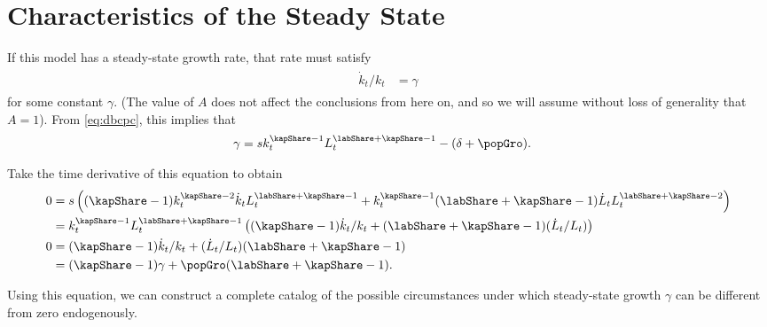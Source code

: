 \documentclass{handout}
\begin{document}
\section{Characteristics of the Steady State}

If this model has a steady-state growth rate, that rate must
satisfy
\begin{equation}\begin{gathered}\begin{aligned}
  \label{eq:ss}
  \dot{k}_t / k_t & =  \gamma
\end{aligned}\end{gathered}\end{equation}
for some constant $\gamma$.  (The value of $A$ does not affect the conclusions
from here on, and so we will assume without loss of generality that $A=1$).  From \eqref{eq:dbcpc}, this implies
that 
\begin{equation}\begin{gathered}\begin{aligned}
  \gamma & =  s k_t^{\kapShare-1} L^{\labShare+\kapShare-1}_t - (\delta+\popGro). \label{eq:gdyn}
\end{aligned}\end{gathered}\end{equation}

Take the time derivative of this equation to obtain
\begin{equation}\begin{gathered}\begin{aligned}
  0 & =  s\left((\kapShare-1)k_t^{\kapShare-2}\dot{k}_t L_t^{\labShare+\kapShare-1}+k_t^{\kapShare-1}(\labShare+\kapShare-1)\dot{L}_t L_t^{\labShare+\kapShare-2}\right)
\\  & =  k_{t}^{\kapShare-1}L_{t}^{\labShare+\kapShare-1}\left((\kapShare-1)\dot{k}_t/k_{t} +(\labShare+\kapShare-1)(\dot{L}_t/L_t)\right)
\\ 0 & =  (\kapShare-1) \dot{k}_t/k_t + (\dot{L}_t/L_t) (\labShare+\kapShare-1)
\\   & =  (\kapShare-1) \gamma + \popGro (\labShare+\kapShare-1). \label{eq:AKeqn}
\end{aligned}\end{gathered}\end{equation}

Using this equation, we can construct a complete catalog of the
possible circumstances under which steady-state growth $\gamma$ can
be different from zero endogenously.
\end{document}
